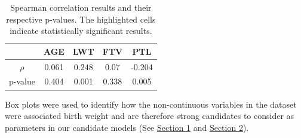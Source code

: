 \newpage
\renewcommand{\arraystretch}{1.5}
\begin{table}[!htb]
    \centering
    \begin{tabular}{ |c|c|c|c|c| } 
     \hline
     & AGE & LWT & FTV & PTL \\
     \hline
     $\rho$ & 0.061 & 0.248 & 0.07 & -0.204 \\
     \hline
     p-value & 0.404 & \cellcolor{blue!25}0.001 & 0.338 & \cellcolor{blue!25}0.005 \\
     \hline
    \end{tabular}
    \captionsetup{width=.69\linewidth}
    \caption{Spearman correlation results and their respective p-values. The highlighted cells indicate statistically significant results.}
    \label{tab:Spearman}
\end{table}

Box plots were used to identify how the non-continuous variables in the dataset were associated birth weight and are therefore strong candidates to consider as parameters in our candidate models (See \hyperlink{BuildingOne}{Section 1} and \hyperlink{BuildingTwo}{Section 2}).

